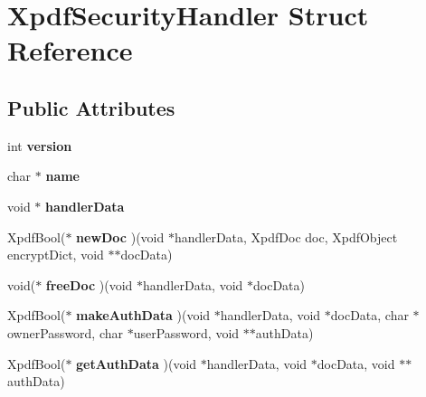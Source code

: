 \hypertarget{struct_xpdf_security_handler}{}\section{Xpdf\+Security\+Handler Struct Reference}
\label{struct_xpdf_security_handler}
\subsection*{Public Attributes}
\begin{DoxyCompactItemize}
\item 
\mbox{\label{struct_xpdf_security_handler_a96a4229e608d5b7b1ec99a7d770f02ec}} 
int {\bfseries version}
\item 
\mbox{\label{struct_xpdf_security_handler_ab2034ae5966841d6b2c744c05a3adc66}} 
char $\ast$ {\bfseries name}
\item 
\mbox{\label{struct_xpdf_security_handler_a98ae1c292574f185d3b440b1ff19eb5b}} 
void $\ast$ {\bfseries handler\+Data}
\item 
\mbox{\label{struct_xpdf_security_handler_aedad807c792bd363139734bd74c0b73a}} 
Xpdf\+Bool($\ast$ {\bfseries new\+Doc} )(void $\ast$handler\+Data, Xpdf\+Doc doc, Xpdf\+Object encrypt\+Dict, void $\ast$$\ast$doc\+Data)
\item 
\mbox{\label{struct_xpdf_security_handler_ac27d6d7141604075f2e0e6a69e0ede26}} 
void($\ast$ {\bfseries free\+Doc} )(void $\ast$handler\+Data, void $\ast$doc\+Data)
\item 
\mbox{\label{struct_xpdf_security_handler_a47892d72c6d04cd259f5d2440ee06bde}} 
Xpdf\+Bool($\ast$ {\bfseries make\+Auth\+Data} )(void $\ast$handler\+Data, void $\ast$doc\+Data, char $\ast$owner\+Password, char $\ast$user\+Password, void $\ast$$\ast$auth\+Data)
\item 
\mbox{\label{struct_xpdf_security_handler_a2330e785e8863e27f81ad604358c5cb2}} 
Xpdf\+Bool($\ast$ {\bfseries get\+Auth\+Data} )(void $\ast$handler\+Data, void $\ast$doc\+Data, void $\ast$$\ast$auth\+Data)
$$
\end{DoxyCompactItemize}
